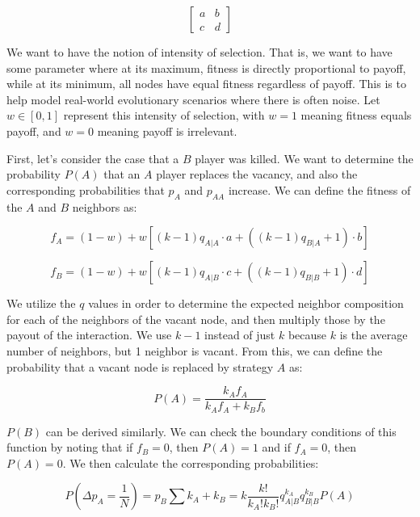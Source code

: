 \documentclass[11pt]{article}
\begin{document}
\begin{equation}
    \begin{bmatrix}
        a & b\\
        c & d
    \end{bmatrix}
\end{equation}

We want to have the notion of intensity of selection. That is, we want to have some parameter where at its maximum, fitness is directly proportional to payoff, while at its minimum, all nodes have equal fitness regardless of payoff. This is to help model real-world evolutionary scenarios where there is often noise. Let $w\in[0,1]$ represent this intensity of selection, with $w = 1$ meaning fitness equals payoff, and $w=0$ meaning payoff is irrelevant. 

First, let's consider the case that a $B$ player was killed. We want to determine the probability $P(A)$ that an $A$ player replaces the vacancy, and also the corresponding probabilities that $p_A$ and $p_{AA}$ increase. We can define the fitness of the $A$ and $B$ neighbors as:

\begin{equation}
    f_A = (1 - w)  + w[(k-1)q_{A|A}\cdot a + ((k-1)q_{B|A}+1)\cdot b]
\end{equation}

\begin{equation}
    f_B = (1 - w)  + w[(k-1)q_{A|B}\cdot c + ((k-1)q_{B|B}+1)\cdot d]
\end{equation}

We utilize the $q$ values in order to determine the expected neighbor composition for each of the neighbors of the vacant node, and then multiply those by the payout of the interaction. We use $k - 1$ instead of just $k$ because $k$ is the average number of neighbors, but 1 neighbor is vacant. From this, we can define the probability that a vacant node is replaced by strategy $A$ as:

\begin{equation}
    P(A) = \frac{k_A f_A}{k_Af_A + k_Bf_b}
\end{equation}

$P(B)$ can be derived similarly. We can check the boundary conditions of this function by noting that if $f_B = 0$, then $P(A) = 1$ and if $f_A = 0$, then $P(A) = 0$. We then calculate the corresponding probabilities:

\begin{equation}
    P\left(\Delta p_A = \frac{1}{N}\right) = p_B \sum{k_A + k_B = k}\frac{k!}{k_A!k_B!}q_{A|B}^{k_A}q_{B|B}^{k_B}P(A)
\end{equation}
\end{document}

